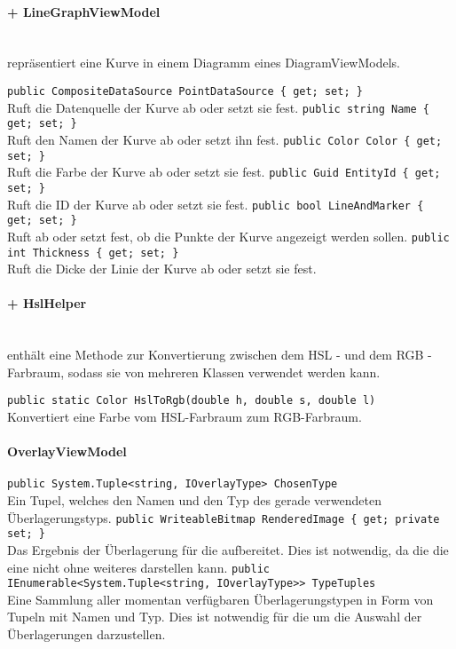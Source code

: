 \paragraph{+ LineGraphViewModel}~\\
 repräsentiert eine Kurve in einem Diagramm eines DiagramViewModels.
\begin{itemize}
	\add \verb!public CompositeDataSource PointDataSource { get; set; }! \\
	Ruft die Datenquelle der Kurve ab oder setzt sie fest.
	\add \verb!public string Name { get; set; }! \\
	Ruft den Namen der Kurve ab oder setzt ihn fest.
	\add \verb!public Color Color { get; set; }! \\
	Ruft die Farbe der Kurve ab oder setzt sie fest.
	\add \verb!public Guid EntityId { get; set; }! \\
	Ruft die ID der Kurve ab oder setzt sie fest.
	\add \verb!public bool LineAndMarker { get; set; }! \\
	Ruft ab oder setzt fest, ob die Punkte der Kurve angezeigt werden sollen.
	\add \verb!public int Thickness { get; set; }! \\
	Ruft die Dicke der Linie der Kurve ab oder setzt sie fest.
\end{itemize}

\paragraph{+ HslHelper}~\\
 enthält eine Methode zur Konvertierung zwischen dem HSL - und dem RGB - Farbraum, sodass sie von mehreren Klassen verwendet werden kann.
\begin{itemize}
	\add \verb!public static Color HslToRgb(double h, double s, double l)! \\
	Konvertiert eine Farbe vom HSL-Farbraum zum RGB-Farbraum.
\end{itemize}

\paragraph{\name OverlayViewModel}
\begin{itemize}
	\add \verb!public System.Tuple<string, IOverlayType> ChosenType! \\
	Ein Tupel, welches den Namen und den Typ des gerade verwendeten Überlagerungstyps.
	\add \verb!public WriteableBitmap RenderedImage { get; private set; }! \\
	Das Ergebnis der Überlagerung für die  aufbereitet. Dies ist notwendig, da die die  eine  nicht ohne weiteres darstellen kann.
	\add \verb!public IEnumerable<System.Tuple<string, IOverlayType>> TypeTuples! \\
	Eine Sammlung aller momentan verfügbaren Überlagerungstypen in Form von Tupeln mit Namen und Typ. Dies ist notwendig für die  um die Auswahl der Überlagerungen darzustellen.
\end{itemize}

